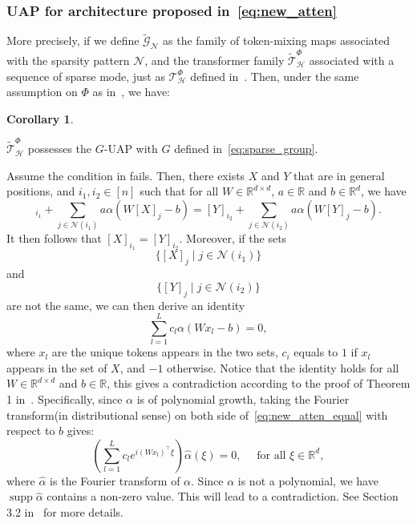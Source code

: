 \documentclass{article}
\newtheorem{corollary}{Corollary}
\begin{document}
\subsubsection{UAP for architecture proposed in~\eqref{eq:new_atten}}
\label{sec:proof_new_atten}
More precisely, if we define $\tilde{\mathcal G}_{\mathcal N}$ as the family of token-mixing maps associated with the sparsity pattern $\mathcal N$, and the transformer family $\tilde{\mathcal T}_{\mathcal H}^\Phi$ associated with a sequence of sparse mode, just as $\mathcal T_{\mathcal H}^\Phi$ defined in~. Then, under the same assumption on $\Phi$ as in~, we have:
\begin{corollary}
    \label{thm:new_atten}
\end{corollary}
$\tilde {\mathcal T}_{\mathcal H}^\Phi$ possesses the $G$-UAP with $G$ defined in~\eqref{eq:sparse_group}.

Assume the condition in  fails. Then, there exists $X$ and $Y$ that are in general positions, and $i_1, i_2\in [n]$ such that for all $W\in\mathbb R^{d\times d}$, $a\in \mathbb R$ and $b\in \mathbb R^d$, we have
\begin{equation}
    [X]_{i_1}+\sum_{j\in\mathcal N(i_1)} a \alpha(W[X]_j-b)=[Y]_{i_2}+\sum_{j\in\mathcal N(i_2)} a \alpha(W[Y]_j-b).
\end{equation}
It then follows that $[X]_{i_1}=[Y]_{i_2}$. Moreover, if the sets 
\begin{equation}
    \{[X]_j\mid j\in \mathcal N(i_1)\}
\end{equation}
and 
\begin{equation}
    \{[Y]_j\mid j\in \mathcal N(i_2)\}
\end{equation}
are not the same, we can then derive an identity
\begin{equation}
    \label{eq:new_atten_equal}
    \sum_{l=1}^L c_l\alpha(Wx_l-b)=0,
\end{equation}
where $x_l$ are the unique tokens appears in the two sets, $c_i$ equals to $1$ if $x_l$ appears in the set of $X$, and $-1$ otherwise. Notice that the identity holds for all $W\in\mathbb R^{d\times d}$ and $b\in\mathbb R$, this gives a contradiction according to the proof of Theorem 1 in~\cite{cheng2025interpolation}.
Specifically, since $\alpha$ is of polynomial growth, taking the Fourier transform(in distributional sense) on both side of~\eqref{eq:new_atten_equal} with respect to $b$ gives:
\begin{equation}
    (\sum_{l=1}^L c_l e^{i (Wx_l)^\top \xi})\hat \alpha(\xi)=0, \quad \text{ for all } \xi\in\mathbb R^d,
\end{equation}
where $\hat \alpha$ is the Fourier transform of $\alpha$. 
Since $\alpha$ is not a polynomial, we have $\operatorname{supp} \hat \alpha$ contains a non-zero value.
This will lead to a contradiction. See Section 3.2 in~\cite{cheng2025interpolation} for more details.
\end{document}
